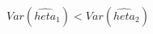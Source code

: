\documentclass[preview]{standalone}
\begin{document}
\begin{center}
$Var(\hat{	heta}_1) < Var(\hat{	heta}_2)$
\end{center}
\end{document}
